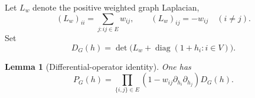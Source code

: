 \documentclass[11pt]{article}
\newtheorem{lemma}[theorem]{Lemma}
\theoremstyle{definition}
\theoremstyle{remark}
\newcommand{\1}{\mathbf 1}
\newcommand{\diag}{\operatorname{diag}}
\begin{document}
Let $L_w$ denote the positive weighted graph Laplacian,
\begin{equation}
 (L_w)_{ii}=\sum_{j:ij\in E}w_{ij},\qquad
 (L_w)_{ij}=-w_{ij}\quad(i\neq j).
\end{equation}
Set
\begin{equation}\label{eq:det-poly}
 D_G(h)=\det\bigl(L_w+\diag(1+h_i:i\in V)\bigr).
\end{equation}

\begin{lemma}[Differential-operator identity]\label{lem:operator-identity}
One has
\begin{equation}\label{eq:operator-identity}
 P_G(h)=
 \prod_{\{i,j\}\in E}
 \left(1-w_{ij}\partial_{h_i}\partial_{h_j}\right)D_G(h).
\end{equation}
\end{lemma}
\end{document}
